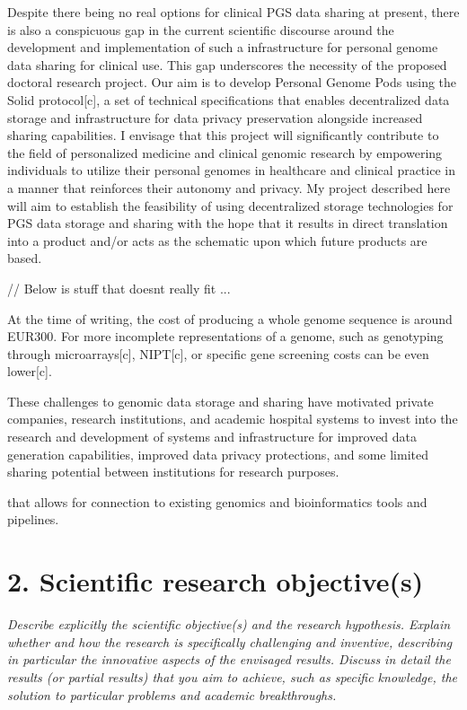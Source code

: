 \documentclass{article}
\begin{document}
Despite there being no real options for clinical PGS data sharing at present, there is also a conspicuous gap in the current scientific discourse around the development and implementation of such a infrastructure for personal genome data sharing for clinical use. 
This gap underscores the necessity of the proposed doctoral research project.
Our aim is to develop Personal Genome Pods using the Solid protocol[c], a set of technical specifications that enables decentralized data storage and infrastructure for data privacy preservation alongside increased sharing capabilities.  
I envisage that this project will significantly contribute to the field of personalized medicine and clinical genomic research by empowering individuals to utilize their personal genomes in healthcare and clinical practice in a manner that reinforces their autonomy and privacy. 
My project described here will aim to establish the feasibility of using decentralized storage technologies for PGS data storage and sharing with the hope that it results in direct translation into a product and/or acts as the schematic upon which future products are based. 


// Below is stuff that doesnt really fit ... 

At the time of writing, the cost of producing a whole genome sequence is around EUR300. 
For more incomplete representations of a genome, such as genotyping through microarrays[c], NIPT[c], or specific gene screening costs can be even lower[c]. 

These challenges to genomic data storage and sharing have motivated private companies, research institutions, and academic hospital systems to invest into the research and development of systems and infrastructure for improved data generation capabilities, improved data privacy protections, and some limited sharing potential between institutions for research purposes. 

that allows for connection to existing genomics and bioinformatics tools and pipelines. 


\section{2. Scientific research objective(s)}
\textit{Describe explicitly the scientific objective(s) and the research hypothesis. Explain whether and how the research is specifically challenging and inventive, describing in particular the innovative aspects of the envisaged results. Discuss in detail the results (or partial results) that you aim to achieve, such as specific knowledge, the solution to particular problems and academic breakthroughs.}
\end{document}
